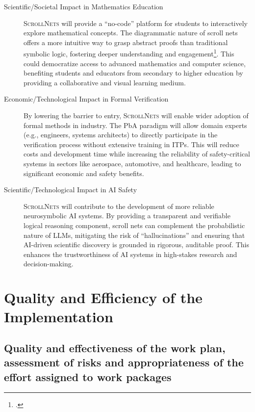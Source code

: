 \documentclass[12pt,draftproposal]{msca-pf}
\newcommand{\proj}{\small\textsc{ScrollNets}}
\begin{document}
\begin{description}
    \item[Scientific/Societal Impact in Mathematics Education] {\proj} will provide a ``no-code'' platform for students to interactively explore mathematical concepts. The diagrammatic nature of scroll nets offers a more intuitive way to grasp abstract proofs than traditional symbolic logic, fostering deeper understanding and engagement\footcite{minhResearchReportProof2024}. This could democratize access to advanced mathematics and computer science, benefiting students and educators from secondary to higher education by providing a collaborative and visual learning medium.

    \item[Economic/Technological Impact in Formal Verification] By lowering the barrier to entry, {\proj} will enable wider adoption of formal methods in industry. The PbA paradigm will allow domain experts (e.g., engineers, systems architects) to directly participate in the verification process without extensive training in ITPs. This will reduce costs and development time while increasing the reliability of safety-critical systems in sectors like aerospace, automotive, and healthcare, leading to significant economic and safety benefits.

    \item[Scientific/Technological Impact in AI Safety] {\proj} will contribute to the development of more reliable neurosymbolic AI systems. By providing a transparent and verifiable logical reasoning component, scroll nets can complement the probabilistic nature of LLMs, mitigating the risk of ``hallucinations'' and ensuring that AI-driven scientific discovery is grounded in rigorous, auditable proof. This enhances the trustworthiness of AI systems in high-stakes research and decision-making.
\end{description}

 

\section{Quality and Efficiency of the Implementation
            }
\label{sc:implementation}

\subsection{Quality and effectiveness of the work plan, assessment of risks and
    appropriateness of the effort assigned to work packages}
\label{ssc:implementation:workplan}
\end{document}
